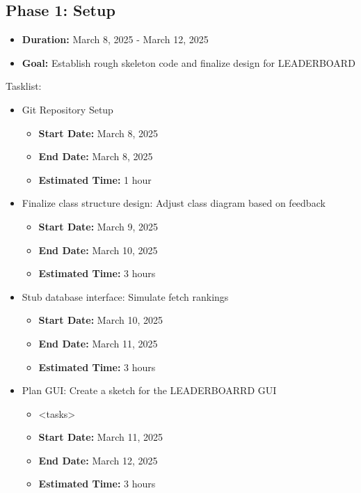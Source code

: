 \documentclass{report}
\begin{document}
\subsection*{Phase 1: Setup}
\begin{itemize}
    \item \textbf{Duration:} March 8, 2025 - March 12, 2025
    \item \textbf{Goal:} Establish rough skeleton code and finalize design for LEADERBOARD
\end{itemize}
Tasklist:
\begin{itemize}
    \item Git Repository Setup
    \begin{itemize}
        \item \textbf{Start Date:} March 8, 2025
        \item \textbf{End Date:} March 8, 2025
        \item \textbf{Estimated Time:} 1 hour
    \end{itemize}
    \item Finalize class structure design: Adjust class diagram based on feedback
    \begin{itemize}
        \item \textbf{Start Date:} March 9, 2025
        \item \textbf{End Date:} March 10, 2025
        \item \textbf{Estimated Time:} 3 hours    
    \end{itemize}
    \item Stub database interface: Simulate fetch rankings
    \begin{itemize}
        \item \textbf{Start Date:} March 10, 2025
        \item \textbf{End Date:} March 11, 2025
        \item \textbf{Estimated Time:} 3 hours
    \end{itemize}
    \item Plan GUI: Create a sketch for the LEADERBOARRD GUI
    \begin{itemize}
        \item <tasks>
        \item \textbf{Start Date:} March 11, 2025
        \item \textbf{End Date:} March 12, 2025
        \item \textbf{Estimated Time:} 3 hours
    \end{itemize}
    
\end{itemize}
\end{document}
